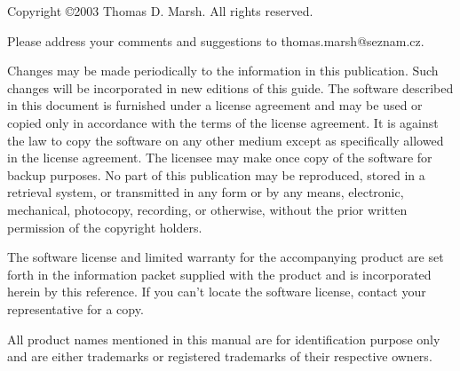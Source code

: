 \ifx\pdfoutput\undefined %
\else
{}
\fi
\newlength{\centeroffset}
\setlength{\centeroffset}{-0.5\oddsidemargin}
\addtolength{\centeroffset}{0.5\evensidemargin}
\thispagestyle{empty}
\noindent\hspace*{\centeroffset}

\noindent\hspace*{\centeroffset}



\pagebreak
\begin{small}
  Copyright \copyright 2003 Thomas D. Marsh.  All rights reserved.

\bigskip

  Please address your comments and suggestions to thomas.marsh@seznam.cz.

  Changes may be made periodically to the information in this publication.
  Such changes will be incorporated in new editions of this guide. The
  software described in this document is furnished under a license
  agreement and may be used or copied only in accordance with the terms
  of the license agreement. It is against the law to copy the software on any
  other medium except as specifically allowed in the license agreement. The
  licensee may make once copy of the software for backup purposes. No
  part of this publication may be reproduced, stored in a retrieval system, or
  transmitted in any form or by any means, electronic, mechanical,
  photocopy, recording, or otherwise, without the prior written permission of
  the copyright holders.

  The software license and limited warranty for the accompanying product
  are set forth in the information packet supplied with the product and is
  incorporated herein by this reference. If you can't locate the software
  license, contact your representative for a copy.

  All product names mentioned in this manual are for identification purpose
  only and are either trademarks or registered trademarks of their respective
  owners.
\end{small}


\endinput

